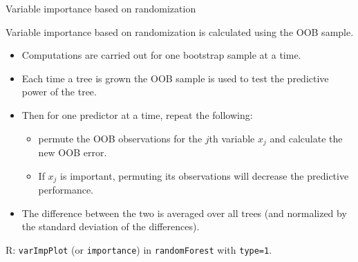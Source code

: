 \documentclass[ignorenonframetext,]{beamer}
\providecommand{\tightlist}{%
  \setlength{\itemsep}{0pt}\setlength{\parskip}{0pt}}
\begin{document}
\begin{frame}[fragile]

\begin{block}{Variable importance based on randomization}

Variable importance based on randomization is calculated using the OOB
sample.

\begin{itemize}
\tightlist
\item
  Computations are carried out for one bootstrap sample at a time.
\item
  Each time a tree is grown the OOB sample is used to test the
  predictive power of the tree.
\item
  Then for one predictor at a time, repeat the following:

  \begin{itemize}
  \tightlist
  \item
    permute the OOB observations for the \(j\)th variable \(x_j\) and
    calculate the new OOB error.
  \item
    If \(x_j\) is important, permuting its observations will decrease
    the predictive performance.
  \end{itemize}
\item
  The difference between the two is averaged over all trees (and
  normalized by the standard deviation of the differences).
\end{itemize}

R: \texttt{varImpPlot} (or \texttt{importance}) in \texttt{randomForest}
with \texttt{type=1}.

\end{block}

\end{frame}
\end{document}
